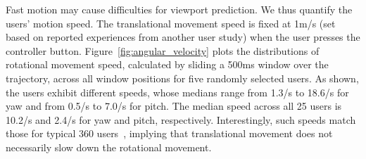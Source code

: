Fast motion may cause difficulties for viewport prediction. We thus quantify the users' motion speed.
The translational movement speed is fixed at 1m/s (set based on reported experiences from another user study)
when the user presses the controller button.
%
Figure~\ref{fig:angular_velocity} plots the distributions of rotational movement speed, calculated by sliding a 500ms window over the trajectory, across all window positions for five randomly selected users. As shown, the users exhibit different speeds, whose medians range from 1.3\degree{}/s to 18.6\degree{}/s for yaw and from 0.5\degree{}/s to 7.0\degree{}/s for pitch.
%
The median speed across all 25 users is 10.2\degree{}/s and 2.4\degree{}/s for yaw and pitch, respectively. Interestingly, such speeds match those for typical 360\degree{} users~\cite{qian2018flare}, implying
that translational movement does not necessarily slow down the rotational movement.


